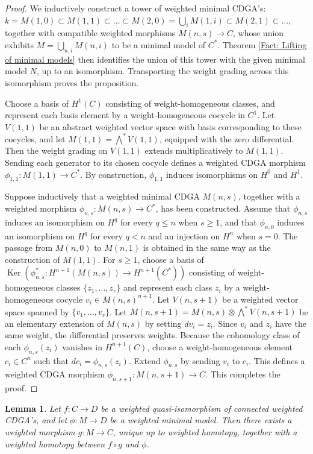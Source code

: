 \documentclass[11pt]{amsart}
\newtheorem{lemma}[theorem]{Lemma}
\theoremstyle{definition}
\numberwithin{equation}{section}
\numberwithin{equation}{section}
\DeclareMathOperator{\Ker}{Ker}
\begin{document}
\begin{proof}
We inductively construct a tower of weighted minimal CDGA's: $k=M(1,0)\subset M(1,1)\subset ...\subset M(2,0)=\bigcup_{i}M(1,i)\subset M(2,1)\subset ...$, together with compatible weighted morphisms $M(n,s)\rightarrow C$, whose union exhibits $M=\bigcup_{n,i}M(n,i)$ to be a minimal model of $C^*$. Theorem \ref{Fact: Lifting of minimal models} then identifies the union of this tower with the given minimal model $N$, up to an isomorphism. Transporting the weight grading across this isomorphism proves the proposition. 

Choose a basis of $H^1(C)$ consisting of weight-homogeneous classes, and represent each basis element by a weight-homogeneous cocycle in $C^1$. Let $V(1,1)$ be an abstract weighted vector space with basis corresponding to these cocycles, and let $M(1,1)=\bigwedge^* V(1,1)$, equipped with the zero differential. Then the weight grading on $V(1,1)$ extends multiplicatively to $M(1,1)$. Sending each generator to its chosen cocycle defines a weighted CDGA morphism $\phi_{1,1}:M(1,1)\rightarrow C^*$. By construction, $\phi_{1,1}$ induces isomorphisms on $H^0$ and $H^1$.

Suppose inductively that a weighted minimal CDGA $M(n,s)$, together with a weighted morphism $\phi_{n,s}:M(n,s)\rightarrow C^*$, has been constructed. Assume that $\phi_{n,s}$ induces an isomorphism on $H^q$ for every $q\leq n$ when $s\geq 1$, and that $\phi_{n,0}$ induces an isomorphism on $H^q$ for every $q< n$ and an injection on $H^{n}$ when $s=0$.
The passage from $M(n,0)$ to $M(n,1)$ is obtained in the same way as the construction of $M(1,1)$. For $s\geq 1$, choose a basis of $\Ker(\phi^*_{n,s}:H^{n+1}(M(n,s))\rightarrow H^{n+1}(C^*))$ consisting of weight-homogeneous classes $\{z_1,...,z_r\}$ and represent each class $z_i$ by a weight-homogeneous cocycle $v_i\in M(n,s)^{n+1}$. Let $V(n,s+1)$ be a weighted vector space spanned by $\{v_1,...,v_r\}$. Let $M(n,s+1)=M(n,s)\otimes \bigwedge^*V(n,s+1)$ be an elementary extension of $M(n,s)$ by setting $dv_i=z_i$. Since $v_i$ and $z_i$ have the same weight, the differential preserves weights. Because the cohomology class of each $\phi_{n,s}(z_i)$ vanishes in $H^{n+1}(C)$, choose a weight-homogeneous element $c_i\in C^{n}$ such that $dc_i=\phi_{n,s}(z_i)$. Extend $\phi_{n,s}$ by sending $v_i$ to $c_i$. This defines a weighted CDGA morphism $\phi_{n,s+1}:M(n,s+1)\rightarrow C$. This completes the proof.
\end{proof}

\begin{lemma}\label{Lem: weighted liftings of weighted minimal model}
Let $f:C\rightarrow D$ be a weighted quasi-isomorphism of connected weighted CDGA's, and let $\phi:M\rightarrow D$ be a weighted minimal model. Then there exists a weighted morphism $g:M\rightarrow C$, unique up to weighted homotopy, together with a weighted homotopy between $f\circ g$ and $\phi$.
\end{lemma}
\end{document}
